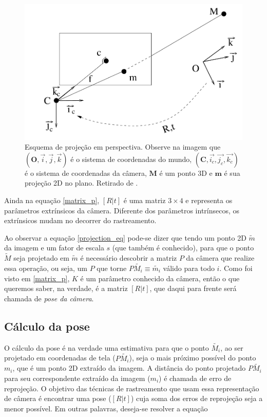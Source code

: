 \begin{figure}[!ht]
\centering\includegraphics[width=5in]{monografia/projection_scheme.png}
\caption{Esquema de projeção em perspectiva. Observe na imagem que $(\mathbf{O}, \vec{i}, \vec{j}, \vec{k})$ é o sistema de coordenadas do mundo, $(\mathbf{C}, \vec{i_c}, \vec{j_c}, \vec{k_c})$ é o sistema de coordenadas da câmera, $\mathbf{M}$ é um ponto 3D e $\mathbf{m}$ é sua projeção 2D no plano. Retirado de \cite{lepetit}.}
\label{projection_scheme}
\end{figure}

Ainda na equação \eqref{matrix_p}, $[R | t]$ é uma matriz $3 \times 4$ e representa os parâmetros extrínsicos da câmera. Diferente dos parâmetros intrínsecos, os extrínsicos mudam no decorrer do rastreamento.

Ao observar a equação \eqref{projection_eq} pode-se dizer que tendo um ponto 2D $\tilde{m}$ da imagem e um fator de escala $s$ (que também é conhecido), para que o ponto $\tilde{M}$ seja projetado em $\tilde{m}$ é necessário descobrir a matriz $P$ da câmera que realize essa operação, ou seja, um $P$ que torne $P\tilde{M_i} \equiv \tilde{m_i}$ válido para todo $i$. Como foi visto em \eqref{matrix_p}, $K$ é um parâmetro conhecido da câmera, então o que queremos saber, na verdade, é a matriz $[R | t]$, que daqui para frente será chamada de \emph{pose da câmera}.

\subsection{Cálculo da pose}

O cálculo da pose é na verdade uma estimativa para que o ponto $\tilde{M_i}$, ao ser projetado em coordenadas de tela ($P\tilde{M_i}$), seja o mais próximo possível do ponto $m_i$, que é um ponto 2D extraído da imagem. A distância do ponto projetado $P\tilde{M_i}$ para seu correspondente extraído da imagem ($m_i$) é chamada de erro de reprojeção. O objetivo das técnicas de rastreamento que usam essa representação de câmera é encontrar uma pose ($[R | t]$) cuja soma dos erros de reprojeção seja a menor possível. Em outras palavras, deseja-se resolver a equação

